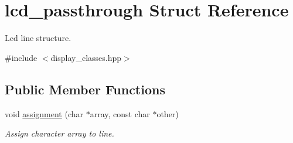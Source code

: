 \hypertarget{structlcd__passthrough}{}\section{lcd\+\_\+passthrough Struct Reference}
\label{structlcd__passthrough}


Lcd line structure.  




{\ttfamily \#include $<$display\+\_\+classes.\+hpp$>$}

\subsection*{Public Member Functions}
\begin{DoxyCompactItemize}
\item 
void \hyperlink{structlcd__passthrough_a74c4254fef0e0e422ac0e078d7824c3a}{assignment} (char $\ast$array, const char $\ast$other)
\begin{DoxyCompactList}\small\item\em Assign character array to line. \end{DoxyCompactList}\end{DoxyCompactItemize}

